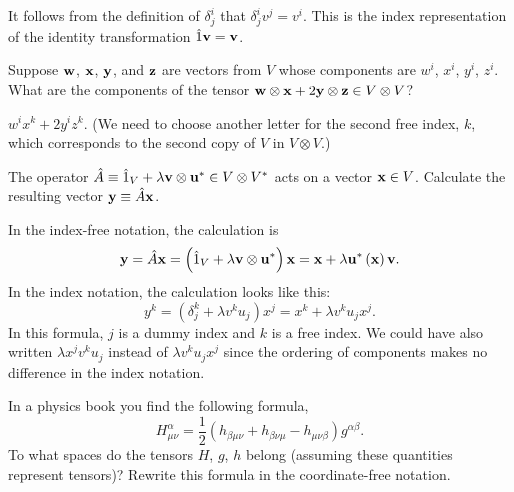 \begin{exa}
 It follows from the definition of $\delta_{j}^{i}$ that $\delta_{j}^{i}v^{j}=v^{i}$.
This is the index representation of the identity transformation $\hat{1}\mathbf{ v}=\mathbf{ v}$. 
\end{exa}





\begin{exa}
Suppose $\mathbf{ w}$, $\mathbf{ x}$, $\mathbf{ y}$, and $\mathbf{ z}$
are vectors from $V$ whose components are $w^{i}$, $x^{i}$, $y^{i}$,
$z^{i}$. What are the components of the tensor $\mathbf{ w}\otimes\mathbf{ x}+2\mathbf{ y}\otimes\mathbf{ z}\in V\otimes V$?
\end{exa}


\begin{solu}
 $w^{i}x^{k}+2y^{i}z^{k}$. (We need to choose another letter for the
second free index, $k$, which corresponds to the second copy of $V$
in $V\otimes V$.)
\end{solu}


\begin{exa}
The operator $\hat{A}\equiv\hat{1}_{V}+\lambda\mathbf{ v}\otimes\mathbf{ u}^{*}\in V\otimes V^{*}$
acts on a vector $\mathbf{ x}\in V$. Calculate the resulting vector
$\mathbf{ y}\equiv\hat{A}\mathbf{ x}$.

In the index-free notation, the calculation is\[
\mathbf{ y}=\hat{A}\mathbf{ x}=\left(\hat{1}_{V}+\lambda\mathbf{ v}\otimes\mathbf{ u}^{*}\right)\mathbf{ x}=\mathbf{ x}+\lambda\mathbf{ u}^{*}\left(\mathbf{ x}\right)\mathbf{ v}.\]
In the index notation, the calculation looks like this:\[
y^{k}=\left(\delta_{j}^{k}+\lambda v^{k}u_{j}\right)x^{j}=x^{k}+\lambda v^{k}u_{j}x^{j}.\]
In this formula, $j$ is a dummy index and $k$ is a free index. We
could have also written $\lambda x^{j}v^{k}u_{j}$ instead of $\lambda v^{k}u_{j}x^{j}$
since the ordering of components makes no difference in the index
notation. 
\end{exa}


\begin{exa}
In a physics book you find the following formula, \[
H_{\mu\nu}^{\alpha}=\dfrac{1}{2}\left(h_{\beta\mu\nu}+h_{\beta\nu\mu}-h_{\mu\nu\beta}\right)g^{\alpha\beta}.\]
To what spaces do the tensors $H$, $g$, $h$ belong (assuming these
quantities represent tensors)? Rewrite this formula in the coordinate-free
notation.
\end{exa}


